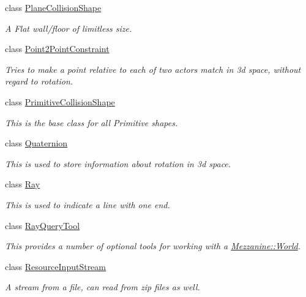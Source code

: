 \begin{DoxyCompactItemize}
class \hyperlink{classMezzanine_1_1PlaneCollisionShape}{PlaneCollisionShape}
\begin{DoxyCompactList}\small\item\em A Flat wall/floor of limitless size. \item\end{DoxyCompactList}\item 
class \hyperlink{classMezzanine_1_1Point2PointConstraint}{Point2PointConstraint}
\begin{DoxyCompactList}\small\item\em Tries to make a point relative to each of two actors match in 3d space, without regard to rotation. \item\end{DoxyCompactList}\item 
class \hyperlink{classMezzanine_1_1PrimitiveCollisionShape}{PrimitiveCollisionShape}
\begin{DoxyCompactList}\small\item\em This is the base class for all Primitive shapes. \item\end{DoxyCompactList}\item 
class \hyperlink{classMezzanine_1_1Quaternion}{Quaternion}
\begin{DoxyCompactList}\small\item\em This is used to store information about rotation in 3d space. \item\end{DoxyCompactList}\item 
class \hyperlink{classMezzanine_1_1Ray}{Ray}
\begin{DoxyCompactList}\small\item\em This is used to indicate a line with one end. \item\end{DoxyCompactList}\item 
class \hyperlink{classMezzanine_1_1RayQueryTool}{RayQueryTool}
\begin{DoxyCompactList}\small\item\em This provides a number of optional tools for working with a \hyperlink{classMezzanine_1_1World}{Mezzanine::World}. \item\end{DoxyCompactList}\item 
class \hyperlink{classMezzanine_1_1ResourceInputStream}{ResourceInputStream}
\begin{DoxyCompactList}\small\item\em A stream from a file, can read from zip files as well. \item\end{DoxyCompactList}\item 

\end{DoxyCompactItemize}
